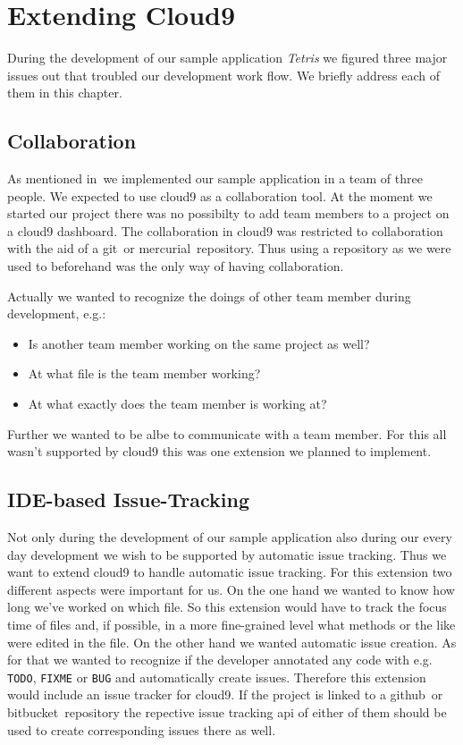 \section{Extending Cloud9}
\label{sec:Approaches}
During the development of our sample application \emph{Tetris} we figured three major issues out that troubled our development work flow.
We briefly address each of them in this chapter.

\subsection{Collaboration}
As mentioned in~ we implemented our sample application in a team of three people.
We expected to use cloud9 as a collaboration tool.
At the moment we started our project there was no possibilty to add team members to a project on a cloud9 dashboard.
The collaboration in cloud9 was restricted to collaboration with the aid of a git~\needcite or mercurial~\needcite repository.
Thus using a repository as we were used to beforehand was the only way of having collaboration.

Actually we wanted to recognize the doings of other team member during development, e.g.:
\begin{itemize}
    \item Is another team member working on the same project as well?
    \item At what file is the team member working?
    \item At what exactly does the team member is working at?
\end{itemize}
Further we wanted to be albe to communicate with a team member.
For this all wasn't supported by cloud9 this was one extension we planned to implement.

\subsection{IDE-based Issue-Tracking}
Not only during the development of our sample application also during our every day development we wish to be supported by automatic issue tracking.
Thus we want to extend cloud9 to handle automatic issue tracking.
For this extension two different aspects were important for us.
On the one hand we wanted to know how long we've worked on which file.
So this extension would have to track the focus time of files and, if possible, in a more fine-grained level what methods or the like were edited in the file.
On the other hand we wanted automatic issue creation.
As for that we wanted to recognize if the developer annotated any code with e.g. \texttt{TODO}, \texttt{FIXME} or \texttt{BUG} and automatically create issues.
Therefore this extension would include an issue tracker for cloud9.
If the project is linked to a github~\needcite or bitbucket~\needcite repository the repective issue tracking api of either of them should be used to create corresponding issues there as well.

